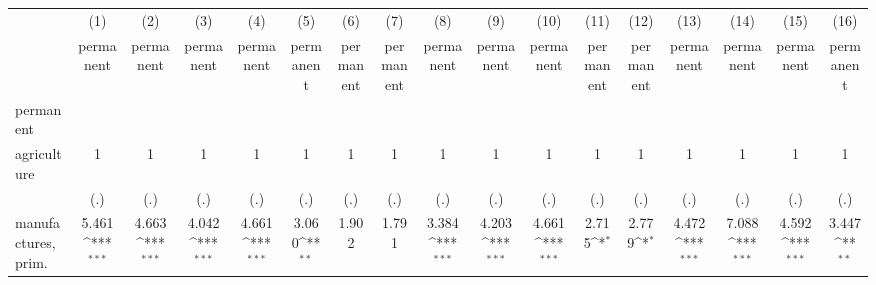 {
\def\sym#1{\ifmmode^{#1}\else\(^{#1}\)\fi}
\begin{tabular}{l*{16}{c}}
\hline\hline
                    &\multicolumn{1}{c}{(1)}&\multicolumn{1}{c}{(2)}&\multicolumn{1}{c}{(3)}&\multicolumn{1}{c}{(4)}&\multicolumn{1}{c}{(5)}&\multicolumn{1}{c}{(6)}&\multicolumn{1}{c}{(7)}&\multicolumn{1}{c}{(8)}&\multicolumn{1}{c}{(9)}&\multicolumn{1}{c}{(10)}&\multicolumn{1}{c}{(11)}&\multicolumn{1}{c}{(12)}&\multicolumn{1}{c}{(13)}&\multicolumn{1}{c}{(14)}&\multicolumn{1}{c}{(15)}&\multicolumn{1}{c}{(16)}\\
                    &\multicolumn{1}{c}{permanent}&\multicolumn{1}{c}{permanent}&\multicolumn{1}{c}{permanent}&\multicolumn{1}{c}{permanent}&\multicolumn{1}{c}{permanent}&\multicolumn{1}{c}{permanent}&\multicolumn{1}{c}{permanent}&\multicolumn{1}{c}{permanent}&\multicolumn{1}{c}{permanent}&\multicolumn{1}{c}{permanent}&\multicolumn{1}{c}{permanent}&\multicolumn{1}{c}{permanent}&\multicolumn{1}{c}{permanent}&\multicolumn{1}{c}{permanent}&\multicolumn{1}{c}{permanent}&\multicolumn{1}{c}{permanent}\\
\hline
permanent           &                     &                     &                     &                     &                     &                     &                     &                     &                     &                     &                     &                     &                     &                     &                     &                     \\
agriculture         &           1         &           1         &           1         &           1         &           1         &           1         &           1         &           1         &           1         &           1         &           1         &           1         &           1         &           1         &           1         &           1         \\
                    &         (.)         &         (.)         &         (.)         &         (.)         &         (.)         &         (.)         &         (.)         &         (.)         &         (.)         &         (.)         &         (.)         &         (.)         &         (.)         &         (.)         &         (.)         &         (.)         \\
[1em]
manufactures, prim. &       5.461\sym{***}&       4.663\sym{***}&       4.042\sym{***}&       4.661\sym{***}&       3.060\sym{**} &       1.902         &       1.791         &       3.384\sym{***}&       4.203\sym{***}&       4.661\sym{***}&       2.715\sym{*}  &       2.779\sym{*}  &       4.472\sym{***}&       7.088\sym{***}&       4.592\sym{***}&       3.447\sym{**} \\

\end{tabular}}
